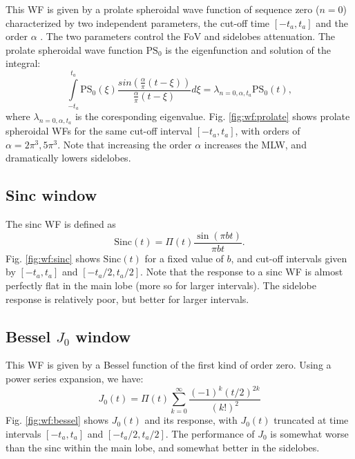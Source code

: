 \documentclass[useAMS,usenatbib]{mn2e}
\begin{document}
This WF is given by a prolate spheroidal wave function of sequence zero ($n=0$) characterized
by two independent parameters, the cut-off time $[-t_a,t_a]$ and the order $\alpha$ 
\citep{landau1978prolate,delsarte1985discrete}. 
The two parameters control the  FoV and sidelobes attenuation.
The prolate spheroidal wave function $\mathrm{PS}_0$ is the eigenfunction and solution of the integral:
\begin{equation}
\int\limits_{-t_a}^{t_a} \mathrm{PS}_{0}(\xi) \frac{sin(\frac{\alpha}{\pi}(t-\xi))}{\frac{\alpha}{\pi}(t-\xi)}d\xi=\lambda_{n=0,\alpha,t_a}\mathrm{PS}_{0}(t), 
\end{equation}
where $\lambda_{n=0,\alpha,t_a}$ is the coresponding eigenvalue. Fig. \ref{fig:wf:prolate} shows prolate 
spheroidal WFs for the same cut-off interval $[-t_a,t_a]$, with orders of $\alpha=2\pi^3, 5\pi^3$. 
Note that increasing the order $\alpha$ increases the MLW, and dramatically lowers sidelobes.

\subsection{Sinc window}


The sinc WF is defined as 
\begin{equation}
\mathrm{Sinc}(t)= \Pi(t) \frac{\sin(\pi b t)}{\pi b t} .
\end{equation}
Fig. \ref{fig:wf:sinc} shows $\mathrm{Sinc}(t)$ for a fixed value of $b$, and cut-off intervals given 
by $[-t_a,t_a]$ and $[-t_a/2,t_a/2]$. Note that the response to a sinc WF is almost perfectly flat in the main lobe (more so for larger intervals). The sidelobe response is relatively poor, but better for larger intervals.

\subsection{Bessel $J_0$ window}
\label{Bessel}

This WF is given by a Bessel function of the first kind of order zero. Using a power series expansion, we have:
\begin{equation}
J_0(t) = \Pi(t) \sum_{k=0}^{\infty}\frac{(-1)^k (t/2)^{2k}}{(k!)^2}
\end{equation}
Fig. \ref{fig:wf:bessel} shows $J_0(t)$ and its response, with $J_0(t)$ truncated at time intervals $[-t_a,t_a]$ and 
$[-t_a/2,t_a/2]$. The performance of $J_0$ is somewhat worse than the sinc within the main lobe, and somewhat better in
the sidelobes.
\end{document}
